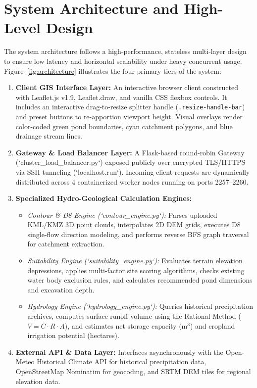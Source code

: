 \documentclass[manuscript,screen,review]{acmart}
\begin{document}
\section{System Architecture and High-Level Design}
\label{sec:architecture}
The system architecture follows a high-performance, stateless multi-layer design to ensure low latency and horizontal scalability under heavy concurrent usage. Figure~\ref{fig:architecture} illustrates the four primary tiers of the system:
\begin{enumerate}
    \item \textbf{Client GIS Interface Layer:} An interactive browser client constructed with Leaflet.js v1.9, Leaflet.draw, and vanilla CSS flexbox controls. It includes an interactive drag-to-resize splitter handle (\texttt{.resize-handle-bar}) and preset buttons to re-apportion viewport height. Visual overlays render color-coded green pond boundaries, cyan catchment polygons, and blue drainage stream lines.
    \item \textbf{Gateway \& Load Balancer Layer:} A Flask-based round-robin Gateway (`cluster_load_balancer.py`) exposed publicly over encrypted TLS/HTTPS via SSH tunneling (`localhost.run`). Incoming client requests are dynamically distributed across 4 containerized worker nodes running on ports 2257--2260.
    \item \textbf{Specialized Hydro-Geological Calculation Engines:} 
    \begin{itemize}
        \item \emph{Contour \& D8 Engine (`contour_engine.py`):} Parses uploaded KML/KMZ 3D point clouds, interpolates 2D DEM grids, executes D8 single-flow direction modeling, and performs reverse BFS graph traversal for catchment extraction.
        \item \emph{Suitability Engine (`suitability_engine.py`):} Evaluates terrain elevation depressions, applies multi-factor site scoring algorithms, checks existing water body exclusion rules, and calculates recommended pond dimensions and excavation depth.
        \item \emph{Hydrology Engine (`hydrology_engine.py`):} Queries historical precipitation archives, computes surface runoff volume using the Rational Method ($V = C \cdot R \cdot A$), and estimates net storage capacity ($\text{m}^3$) and cropland irrigation potential (hectares).
    \end{itemize}
    \item \textbf{External API & Data Layer:} Interfaces asynchronously with the Open-Meteo Historical Climate API for historical precipitation data, OpenStreetMap Nominatim for geocoding, and SRTM DEM tiles for regional elevation data.
\end{enumerate}
\end{document}
